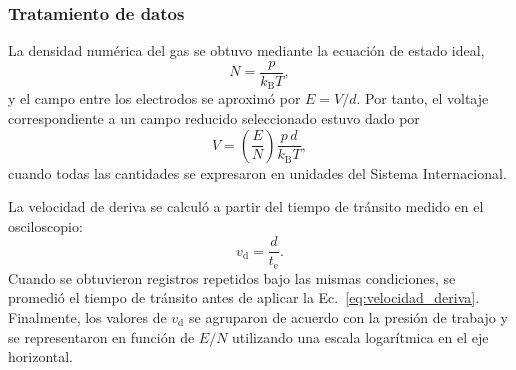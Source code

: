 \subsubsection{Tratamiento de datos}
\label{subsubsec:tratamiento-townsend}

La densidad numérica del gas se obtuvo mediante la ecuación de estado ideal,
\begin{equation}
    N=\frac{p}{k_{\mathrm B}T},
\end{equation}
y el campo entre los electrodos se aproximó por $E=V/d$. Por tanto, el voltaje correspondiente a un campo reducido seleccionado estuvo dado por
\begin{equation}
    V=\left(\frac{E}{N}\right)\frac{p\,d}{k_{\mathrm B}T},
    \label{eq:voltaje_EN}
\end{equation}
cuando todas las cantidades se expresaron en unidades del Sistema Internacional.

La velocidad de deriva se calculó a partir del tiempo de tránsito medido en el osciloscopio:
\begin{equation}
    v_{\mathrm d}=\frac{d}{t_{\mathrm e}}.
    \label{eq:velocidad_deriva}
\end{equation}
Cuando se obtuvieron registros repetidos bajo las mismas condiciones, se promedió el tiempo de tránsito antes de aplicar la Ec.~\eqref{eq:velocidad_deriva}. Finalmente, los valores de $v_{\mathrm d}$ se agruparon de acuerdo con la presión de trabajo y se representaron en función de $E/N$ utilizando una escala logarítmica en el eje horizontal.
